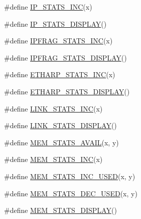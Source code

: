 \begin{DoxyCompactItemize}
\item 
\#define \hyperlink{openmote-cc2538_2lwip_2src_2include_2lwip_2stats_8h_af0a2079f449ce75c1eb49b8a5c922de8}{I\+P\+\_\+\+S\+T\+A\+T\+S\+\_\+\+I\+NC}(x)
\item 
\#define \hyperlink{openmote-cc2538_2lwip_2src_2include_2lwip_2stats_8h_adb69913e155d092852bcaa27e599b864}{I\+P\+\_\+\+S\+T\+A\+T\+S\+\_\+\+D\+I\+S\+P\+L\+AY}()
\item 
\#define \hyperlink{openmote-cc2538_2lwip_2src_2include_2lwip_2stats_8h_a2eb4cc22608c8abe8595e90efd56ae81}{I\+P\+F\+R\+A\+G\+\_\+\+S\+T\+A\+T\+S\+\_\+\+I\+NC}(x)
\item 
\#define \hyperlink{openmote-cc2538_2lwip_2src_2include_2lwip_2stats_8h_acd0d1d9dac48c36b5eafcc76ba6414cf}{I\+P\+F\+R\+A\+G\+\_\+\+S\+T\+A\+T\+S\+\_\+\+D\+I\+S\+P\+L\+AY}()
\item 
\#define \hyperlink{openmote-cc2538_2lwip_2src_2include_2lwip_2stats_8h_aea3a36c64f7159af04b7acc985402edc}{E\+T\+H\+A\+R\+P\+\_\+\+S\+T\+A\+T\+S\+\_\+\+I\+NC}(x)
\item 
\#define \hyperlink{openmote-cc2538_2lwip_2src_2include_2lwip_2stats_8h_a558b6a7fcc76a1b26c103c4797c7ce5a}{E\+T\+H\+A\+R\+P\+\_\+\+S\+T\+A\+T\+S\+\_\+\+D\+I\+S\+P\+L\+AY}()
\item 
\#define \hyperlink{openmote-cc2538_2lwip_2src_2include_2lwip_2stats_8h_a9b28a3eaea720ca831d4b33545b95871}{L\+I\+N\+K\+\_\+\+S\+T\+A\+T\+S\+\_\+\+I\+NC}(x)
\item 
\#define \hyperlink{openmote-cc2538_2lwip_2src_2include_2lwip_2stats_8h_a1be80e9854df72d7dd9b3e9839ab6132}{L\+I\+N\+K\+\_\+\+S\+T\+A\+T\+S\+\_\+\+D\+I\+S\+P\+L\+AY}()
\item 
\#define \hyperlink{openmote-cc2538_2lwip_2src_2include_2lwip_2stats_8h_a6ca3d10f92a30f5435aace26fa7d6020}{M\+E\+M\+\_\+\+S\+T\+A\+T\+S\+\_\+\+A\+V\+A\+IL}(x,  y)
\item 
\#define \hyperlink{openmote-cc2538_2lwip_2src_2include_2lwip_2stats_8h_aa6bb9e8fcc38e7febafd7ef682700786}{M\+E\+M\+\_\+\+S\+T\+A\+T\+S\+\_\+\+I\+NC}(x)
\item 
\#define \hyperlink{openmote-cc2538_2lwip_2src_2include_2lwip_2stats_8h_aefec777cb83885b2f399afb661cf3837}{M\+E\+M\+\_\+\+S\+T\+A\+T\+S\+\_\+\+I\+N\+C\+\_\+\+U\+S\+ED}(x,  y)
\item 
\#define \hyperlink{openmote-cc2538_2lwip_2src_2include_2lwip_2stats_8h_a8ff88328a91828b01070a90a1894815f}{M\+E\+M\+\_\+\+S\+T\+A\+T\+S\+\_\+\+D\+E\+C\+\_\+\+U\+S\+ED}(x,  y)
\item 
\#define \hyperlink{openmote-cc2538_2lwip_2src_2include_2lwip_2stats_8h_ae2f2b54057cfba82517799a4c1441bbe}{M\+E\+M\+\_\+\+S\+T\+A\+T\+S\+\_\+\+D\+I\+S\+P\+L\+AY}()

\end{DoxyCompactItemize}
